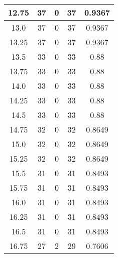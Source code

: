 \documentclass[letterpaper, 12pt]{article}
\begin{document}
\begin{longtable}{|c|c|c|c|c|}
\hline
12.75 & 37 & 0 & 37 & 0.9367 \\
\hline
13.0 & 37 & 0 & 37 & 0.9367 \\
\hline
13.25 & 37 & 0 & 37 & 0.9367 \\
\hline
13.5 & 33 & 0 & 33 & 0.88 \\
\hline
13.75 & 33 & 0 & 33 & 0.88 \\
\hline
14.0 & 33 & 0 & 33 & 0.88 \\
\hline
14.25 & 33 & 0 & 33 & 0.88 \\
\hline
14.5 & 33 & 0 & 33 & 0.88 \\
\hline
14.75 & 32 & 0 & 32 & 0.8649 \\
\hline
15.0 & 32 & 0 & 32 & 0.8649 \\
\hline
15.25 & 32 & 0 & 32 & 0.8649 \\
\hline
15.5 & 31 & 0 & 31 & 0.8493 \\
\hline
15.75 & 31 & 0 & 31 & 0.8493 \\
\hline
16.0 & 31 & 0 & 31 & 0.8493 \\
\hline
16.25 & 31 & 0 & 31 & 0.8493 \\
\hline
16.5 & 31 & 0 & 31 & 0.8493 \\
\hline
16.75 & 27 & 2 & 29 & 0.7606 \\
\hline
\end{longtable}
\end{document}
